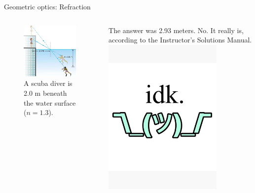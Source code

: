 \documentclass{beamer}
\begin{document}
\begin{frame}{Geometric optics: Refraction}
\begin{columns}[T]
\begin{column}{0.5\textwidth}
\begin{figure}
\centering
\includegraphics[width=0.95\textwidth]{figures/scuba.png}
\caption{\label{fig:scuba4} \footnotesize A scuba diver is 2.0 m beneath the water surface ($n=1.3$).}
\end{figure}
\end{column}
\begin{column}{0.5\textwidth}
The answer was 2.93 meters.  No.  It really is, according to the Instructor's Solutions Manual. \\
\includegraphics[width=0.75\textwidth]{figures/idk.jpg}

\end{column}
\end{columns}
\end{frame}
\end{document}
